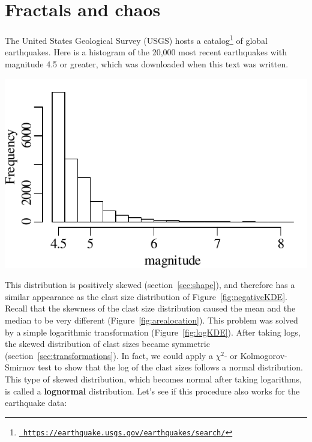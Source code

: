 \chapter{Fractals and chaos}
\label{ch:fractals}

The United States Geological Survey (USGS) hosts a
catalog\footnote{\href{https://earthquake.usgs.gov/earthquakes/search/}{\tt
    https://earthquake.usgs.gov/earthquakes/search/}} of global
earthquakes. Here is a histogram of the 20,000 most recent earthquakes
with magnitude 4.5 or greater, which was downloaded when this text was
written.

\noindent\begin{minipage}[t][][b]{.4\textwidth}
  \includegraphics[width=\textwidth]{../figures/recentquakes.pdf}\medskip
\end{minipage}
\begin{minipage}[t][][t]{.6\textwidth}
  \label{fig:recentquakes}
\end{minipage}

This distribution is positively skewed (section~\ref{sec:shape}), and
therefore has a similar appearance as the clast size distribution of
Figure~\ref{fig:negativeKDE}. Recall that the skewness of the clast
size distribution caused the mean and the median to be very different
(Figure~\ref{fig:arealocation}). This problem was solved by a simple
logarithmic transformation (Figure~\ref{fig:logKDE}). After taking
logs, the skewed distribution of clast sizes became symmetric
(section~\ref{sec:transformations}).  In fact, we could apply a
$\chi^2$- or Kolmogorov-Smirnov test to show that the log of the clast
sizes follows a normal distribution.  This type of skewed
distribution, which becomes normal after taking logarithms, is called
a \textbf{lognormal} distribution. Let's see if this procedure also
works for the earthquake data:\medskip

